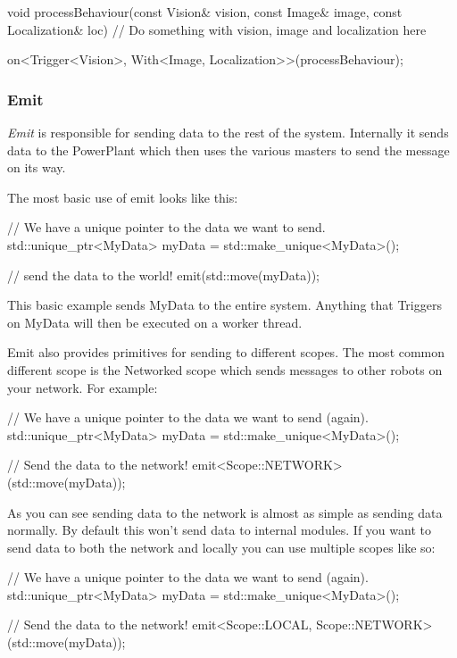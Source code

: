 \documentclass[english,12pt]{scrartcl}
\begin{document}
				\begin{cppcode}
					void processBehaviour(const Vision& vision, const Image& image, 
					    const Localization& loc) {
					    // Do something with vision, image and localization here
					}
					
					on<Trigger<Vision>, With<Image, Localization>>(processBehaviour);
				\end{cppcode}
				
			\subsubsection{Emit}
				\emph{Emit} is responsible for sending data to the rest of the system.
				Internally it sends data to the PowerPlant which then uses the various masters to send the message on its way.
				
				The most basic use of emit looks like this:
				
				\begin{cppcode}
					// We have a unique pointer to the data we want to send.
					std::unique_ptr<MyData> myData = std::make_unique<MyData>();
					
					// send the data to the world!
					emit(std::move(myData));
				\end{cppcode}
				
				This basic example sends MyData to the entire system.
				Anything that Triggers on MyData will then be executed on a worker thread.
				
				Emit also provides primitives for sending to different scopes.
				The most common different scope is the Networked scope which sends messages to other robots on your network.
				For example:
				
				\begin{cppcode}
					// We have a unique pointer to the data we want to send (again).
					std::unique_ptr<MyData> myData = std::make_unique<MyData>();
					
					// Send the data to the network!
					emit<Scope::NETWORK>(std::move(myData));
				\end{cppcode}
				
				As you can see sending data to the network is almost as simple as sending data normally.
				By default this won't send data to internal modules. 
				If you want to send data to both the network and locally you can use multiple scopes like so:
				
				\begin{cppcode}
					// We have a unique pointer to the data we want to send (again).
					std::unique_ptr<MyData> myData = std::make_unique<MyData>();
					
					// Send the data to the network!
					emit<Scope::LOCAL, Scope::NETWORK>(std::move(myData));
				\end{cppcode}
				
\end{document}
